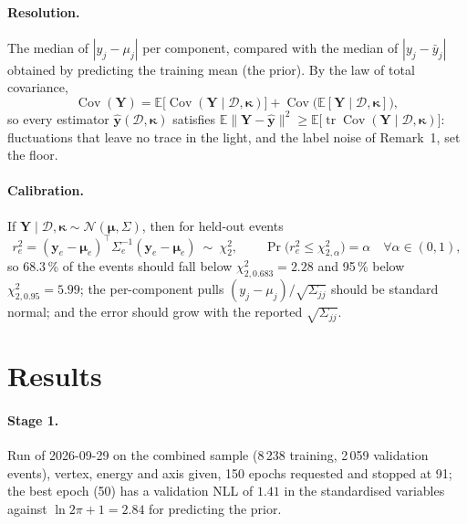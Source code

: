 \documentclass[11pt]{article}
\theoremstyle{definition}
\newcommand{\D}{\mathcal{D}}
\newcommand{\y}{\bm{y}}
\newcommand{\E}{\mathbb{E}}
\newcommand{\N}{\mathcal{N}}
\DeclareMathOperator{\Cov}{Cov}
\DeclareMathOperator{\tr}{tr}
\begin{document}
\paragraph{Resolution.}
The median of $|y_j-\mu_j|$ per component, compared with the median of $|y_j-\bar y_j|$ obtained by predicting
the training mean (the prior). By the law of total covariance,
\begin{equation}
  \Cov(\bm Y) = \E\big[\Cov(\bm Y\mid\D,\bm\kappa)\big] + \Cov\big(\E[\bm Y\mid\D,\bm\kappa]\big),
\end{equation}
so every estimator $\hat{\y}(\D,\bm\kappa)$ satisfies
$\E\|\bm Y-\hat{\y}\|^2\ge\E\big[\tr\Cov(\bm Y\mid\D,\bm\kappa)\big]$: fluctuations that leave no trace in the light,
and the label noise of Remark~1, set the floor.

\paragraph{Calibration.}
If $\bm Y\mid\D,\bm\kappa\sim\N(\bm\mu,\Sigma)$, then for held-out events
\begin{equation}
  r_e^2 = (\y_e-\bm\mu_e)^\top\Sigma_e^{-1}(\y_e-\bm\mu_e)\ \sim\ \chi^2_2,\qquad
  \Pr\big(r_e^2\le\chi^2_{2,\alpha}\big) = \alpha\quad\forall\alpha\in(0,1),
\end{equation}
so 68.3\,\% of the events should fall below $\chi^2_{2,0.683}=2.28$ and 95\,\% below $\chi^2_{2,0.95}=5.99$; the
per-component pulls $(y_j-\mu_j)/\sqrt{\Sigma_{jj}}$ should be standard normal; and the error should grow with the
reported $\sqrt{\Sigma_{jj}}$.

\section{Results}

\paragraph{Stage 1.}
Run of 2026-09-29 on the combined sample (8\,238 training, 2\,059 validation events), vertex, energy and axis
given, 150 epochs requested and stopped at 91; the best epoch (50) has a validation NLL of $1.41$ in the
standardised variables against $\ln2\pi+1=2.84$ for predicting the prior.
\end{document}
